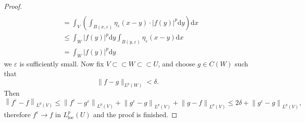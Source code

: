 \begin{proof}
$$\begin{aligned}
\\
&=\int_V{\left( \int_{B\left( x,\varepsilon \right)}{\eta _{\varepsilon}\left( x-y \right) \cdot \left| f\left( y \right) \right|^p}\mathrm{d}y \right) \mathrm{d}x}
\\
&\le \int_W{\left| f\left( y \right) \right|^p\mathrm{d}y\int_{B\left( y,\varepsilon \right)}{\eta _{\varepsilon}\left( x-y \right) \mathrm{d}x}}
\\
&=\int_W{\left| f\left( y \right) \right|^p\mathrm{d}y}
\end{aligned}
$$
we $\varepsilon$ is sufficiently small. Now fix $V\subset\subset W\subset\subset U$, and choose $g\in C(W)$ such that 
$$\|f-g\|_{L^p(W)}<\delta.$$
Then 
$$
\left\| f^{\varepsilon}-f \right\| _{L^p\left( V \right)}\le \left\| f^{\varepsilon}-g^{\varepsilon} \right\| _{L^p\left( V \right)}+\left\| g^{\varepsilon}-g \right\| _{L^p\left( V \right)}+\left\| g-f \right\| _{L^p\left( V \right)}\le 2\delta +\left\| g^{\varepsilon}-g \right\| _{L^p\left( V \right)},
$$
therefore $f^\varepsilon\to f$ in $L_{\mathrm{loc}}^p(U)$ and the proof is finished.
\end{proof}